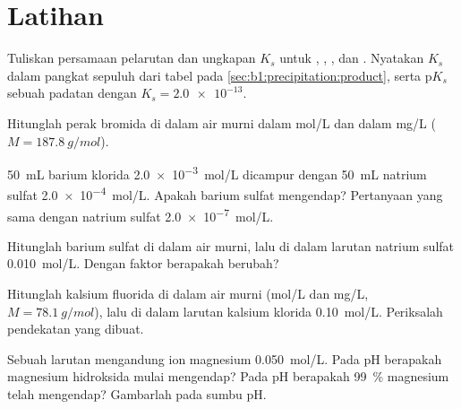 \section{Latihan}

\begin{exercise}[$\star$]\label{exo:b1:precipitation:1}
Tuliskan persamaan pelarutan dan ungkapan $K_s$ untuk ,
, , dan . Nyatakan $K_s$ dalam pangkat
sepuluh dari tabel pada \cref{sec:b1:precipitation:product}, serta
$\mathrm{p}K_s$ sebuah padatan dengan $K_s = \num{2.0e-13}$.
\end{exercise}

\begin{exercise}[$\star$]\label{exo:b1:precipitation:2}
Hitunglah  perak bromida di dalam air murni dalam \unit{mol/L}
dan dalam \unit{mg/L} ($M = \qty{187.8}{g/mol}$).
\end{exercise}

\begin{exercise}[$\star$]\label{exo:b1:precipitation:3}
\qty{50}{mL} barium klorida \qty{2.0e-3}{mol/L} dicampur dengan
\qty{50}{mL} natrium sulfat \qty{2.0e-4}{mol/L}. Apakah barium sulfat
mengendap? Pertanyaan yang sama dengan natrium sulfat
\qty{2.0e-7}{mol/L}.
\end{exercise}

\begin{exercise}[$\star$]\label{exo:b1:precipitation:4}
Hitunglah  barium sulfat di dalam air murni, lalu di dalam
larutan natrium sulfat \qty{0.010}{mol/L}. Dengan faktor berapakah
 berubah?
\end{exercise}

\begin{exercise}[$\star\star$]\label{exo:b1:precipitation:5}
Hitunglah  kalsium fluorida di dalam air murni (\unit{mol/L} dan
\unit{mg/L}, $M = \qty{78.1}{g/mol}$), lalu di dalam larutan kalsium
klorida \qty{0.10}{mol/L}. Periksalah pendekatan yang dibuat.
\end{exercise}

\begin{exercise}[$\star\star$]\label{exo:b1:precipitation:6}
Sebuah larutan mengandung ion magnesium \qty{0.050}{mol/L}. Pada pH
berapakah magnesium hidroksida mulai mengendap? Pada pH berapakah
\qty{99}{\percent} magnesium telah mengendap? Gambarlah 
 pada sumbu pH.
\end{exercise}


